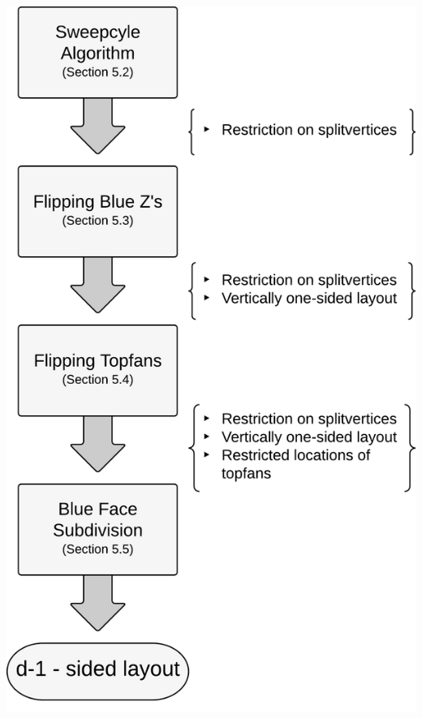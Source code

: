 \documentclass[a4paper]{article}
\begin{document}
\includegraphics[scale=.37]{./unifiedAlgo/img/algoflowext2.pdf}
\clearpage%
\end{document}
